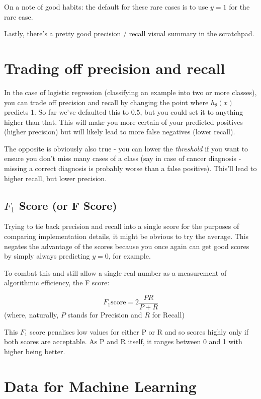 On a note of good habits: the default for these rare cases is to use $y = 1$ for the rare case.

Lastly, there's a pretty good precision / recall visual summary in the scratchpad.

\section{Trading off precision and recall}

In the case of logistic regression (classifying an example into two or more classes), you can trade off precision and recall by changing the point where $h_\theta(x)$ predicts 1. So far we've defaulted this to $0.5$, but you could set it to anything higher than that. This will make you more certain of your predicted positives (higher precision) but will likely lead to more false negatives (lower recall).

The opposite is obviously also true - you can lower the \emph{threshold} if you want to ensure you don't miss many cases of a class (say in case of cancer diagnosis - missing a correct diagnosis is probably worse than a false positive). This'll lead to higher recall, but lower precision.

\subsection{$F_1$ Score (or F Score)}

Trying to tie back precision and recall into a single score for the purposes of comparing implementation details, it might be obvious to try the average. This negates the advantage of the scores because you once again can get good scores by simply always predicting $y = 0$, for example.

To combat this and still allow a single real number as a measurement of algorithmic efficiency, the F score:

\begin{equation}
F_1 \textrm{score} = 2\frac{ PR}{P + R}
\end{equation}
(where, naturally, $P$ stands for Precision and $R$ for Recall)

This $F_1$ score penalises low values for either P or R and so scores highly only if both scores are acceptable. As P and R itself, it ranges between 0 and 1 with higher being better.

\section{Data for Machine Learning}

